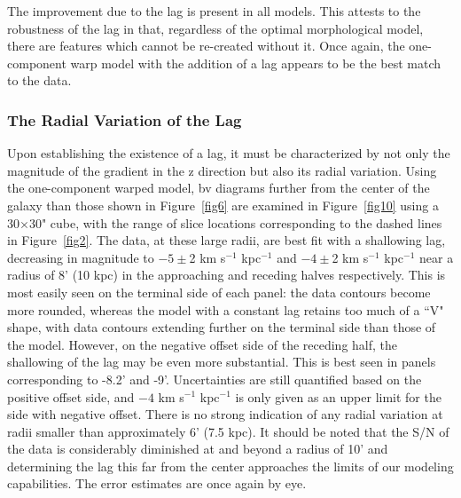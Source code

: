 \documentclass{emulateapj}
\begin{document}
\par
    The improvement due to the lag is present in all models.  This attests to the robustness of the lag in that, regardless of the optimal morphological model, there are features which cannot be re-created without it.  Once again, the one-component warp model with the addition of a lag appears to be the best match to the data.

\subsubsection{The Radial Variation of the Lag}\label{Section4.2.6}

\par
    Upon establishing the existence of a lag, it must be characterized by not only the magnitude of the gradient in the z direction but also its radial variation. Using the one-component warped model, bv diagrams further from the center of the galaxy than those shown in Figure~\ref{fig6} are examined in Figure~\ref{fig10} using a 30$\times$30" cube, with the range of slice locations corresponding to the dashed lines in Figure~\ref{fig2}. The data, at these large radii, are best fit with a shallowing lag, decreasing in magnitude to $-5\pm$2 km s$^{-1}$ kpc$^{-1}$ and $-4\pm$2 km s$^{-1}$ kpc$^{-1}$ near a radius of 8' (10 kpc) in the approaching and receding halves respectively. This is most easily seen on the terminal side of each panel:  the data contours become more rounded, whereas the model with a constant lag retains too much of a ``V" shape, with data contours extending further on the terminal side than those of the model.  However, on the negative offset side of the receding half, the shallowing of the lag may be even more substantial.  This is best seen in panels corresponding to -8.2' and -9'. Uncertainties are still quantified based on the positive offset side, and $-4$ km s$^{-1}$ kpc$^{-1}$ is only given as an upper limit for the side with negative offset.  There is no strong indication of any radial variation at radii smaller than approximately 6'  (7.5 kpc). It should be noted that the S/N of the data is considerably diminished at and beyond a radius of 10' and determining the lag this far from the center approaches the limits of our modeling capabilities.  The error estimates are once again by eye.
\end{document}
